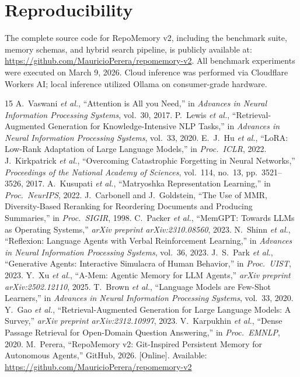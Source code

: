 \documentclass[conference]{IEEEtran}
\begin{document}
\section*{Reproducibility}
The complete source code for RepoMemory v2, including the benchmark suite, memory schemas, and hybrid search pipeline, is publicly available at: \url{https://github.com/MauricioPerera/repomemory-v2}. All benchmark experiments were executed on March 9, 2026. Cloud inference was performed via Cloudflare Workers AI; local inference utilized Ollama on consumer-grade hardware.

\begin{thebibliography}{15}
A.~Vaswani \emph{et al.}, ``Attention is All you Need,'' in \emph{Advances in Neural Information Processing Systems}, vol.~30, 2017.
P.~Lewis \emph{et al.}, ``Retrieval-Augmented Generation for Knowledge-Intensive NLP Tasks,'' in \emph{Advances in Neural Information Processing Systems}, vol.~33, 2020.
E.~J.~Hu \emph{et al.}, ``LoRA: Low-Rank Adaptation of Large Language Models,'' in \emph{Proc.\ ICLR}, 2022.
J.~Kirkpatrick \emph{et al.}, ``Overcoming Catastrophic Forgetting in Neural Networks,'' \emph{Proceedings of the National Academy of Sciences}, vol.~114, no.~13, pp.~3521--3526, 2017.
A.~Kusupati \emph{et al.}, ``Matryoshka Representation Learning,'' in \emph{Proc.\ NeurIPS}, 2022.
J.~Carbonell and J.~Goldstein, ``The Use of MMR, Diversity-Based Reranking for Reordering Documents and Producing Summaries,'' in \emph{Proc.\ SIGIR}, 1998.
C.~Packer \emph{et al.}, ``MemGPT: Towards LLMs as Operating Systems,'' \emph{arXiv preprint arXiv:2310.08560}, 2023.
N.~Shinn \emph{et al.}, ``Reflexion: Language Agents with Verbal Reinforcement Learning,'' in \emph{Advances in Neural Information Processing Systems}, vol.~36, 2023.
J.~S.~Park \emph{et al.}, ``Generative Agents: Interactive Simulacra of Human Behavior,'' in \emph{Proc.\ UIST}, 2023.
Y.~Xu \emph{et al.}, ``A-Mem: Agentic Memory for LLM Agents,'' \emph{arXiv preprint arXiv:2502.12110}, 2025.
T.~Brown \emph{et al.}, ``Language Models are Few-Shot Learners,'' in \emph{Advances in Neural Information Processing Systems}, vol.~33, 2020.
Y.~Gao \emph{et al.}, ``Retrieval-Augmented Generation for Large Language Models: A Survey,'' \emph{arXiv preprint arXiv:2312.10997}, 2023.
V.~Karpukhin \emph{et al.}, ``Dense Passage Retrieval for Open-Domain Question Answering,'' in \emph{Proc.\ EMNLP}, 2020.
M.~Perera, ``RepoMemory v2: Git-Inspired Persistent Memory for Autonomous Agents,'' GitHub, 2026. [Online]. Available: \url{https://github.com/MauricioPerera/repomemory-v2}
\end{thebibliography}
\end{document}
